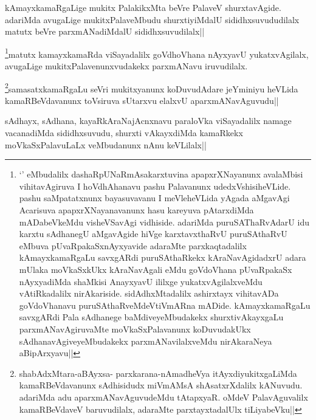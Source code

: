 
\begin{artha}
kAmayxkamaRgaLige mukitx PalakikxMta beVre PalaveV shurxtavAgide. adariMda avugaLige mukitxPalaveMbudu shurxtiyiMdalU sididhxsuvududilalx matutx beVre parxmANadiMdalU sididhxsuvudilalx||
\end{artha}

\begin{artha}
\footnote{`\stext' eMbudalilx dashaRpUNaRmAsakarxtuvina apapxrXNayanunx avalaMbisi vihitavAgiruva I hoVdhAhanavu pashu Palavanunx udedxVshisiheVLide. pashu saMpatatxnunx bayasuvavanu I meVleheVLida yAgada aMgavAgi Acarisuva apapxrXNayanavanunx hasu kareyuva pAtarxdiMda mADabeVkeMdu visheVSavAgi vidhiside. adariMda puruSAThaRvAdarU idu karxtu sAdhanegU aMgavAgide hiVge karxtavxthaRvU puruSAthaRvU eMbuva pUvaRpakaSxnAyxyavide adaraMte parxkaqtadalilx kAmayxkamaRgaLu savxgARdi puruSAthaRkekx kAraNavAgidadxrU adara mUlaka moVkaSxkUkx kAraNavAgali eMdu goVdoVhana pUvaRpakaSx nAyxyadiMda shaMkisi AnayxyavU ililxge yukatxvAgilalxveMdu vAtiRkadalilx nirAkariside. sidAdhxMtadalilx ashirxtayx vihitavADa goVdoVhanavu puruSAthaRveMdeVtiVmARna mADide. kAmayxkamaRgaLu savxgARdi Pala sAdhanege baMdiveyeMbudakekx shurxtivAkayxgaLu parxmANavAgiruvaMte moVkaSxPalavanunx koDuvudakUkx sAdhanavAgiveyeMbudakekx parxmANavilalxveMdu nirAkaraNeya aBipArxyavu||}matutx kamayxkamaRda viSayadalilx goVdhoVhana nAyxyavU yukatxvAgilalx, avugaLige mukitxPalavenunxvudakekx parxmANavu iruvudilalx.
\end{artha}


\begin{artha}
\footnote{shabAdxMtara-aBAyxsa- parxkarana-nAmadheVya itAyxdiyukitxgaLiMda kamaRBeVdavanunx sAdhisidudx miVmAMsA shAsatxrXdalilx kANuvudu. adariMda adu aparxmANavAguvudeMdu tAtapxyaR. oMdeV PalavAguvalilx kamaRBeVdaveV baruvudilalx, adaraMte parxtayxtadalUlx tiLiyabeVku||}samasatxkamaRgaLu seVri mukitxyanunx koDuvudAdare jeYminiyu heVLida kamaRBeVdavanunx toVsiruva sUtarxvu elalxvU aparxmANavAguvudu||
\end{artha}


\begin{artha}
sAdhayx, sAdhana, kayaRkAraNajAcnxnavu paraloVka viSayadalilx namage vacanadiMda sididhxsuvudu, shurxti vAkayxdiMda kamaRkekx moVkaSxPalavuLaLx veMbudanunx nAnu keVLilalx||
\end{artha}

